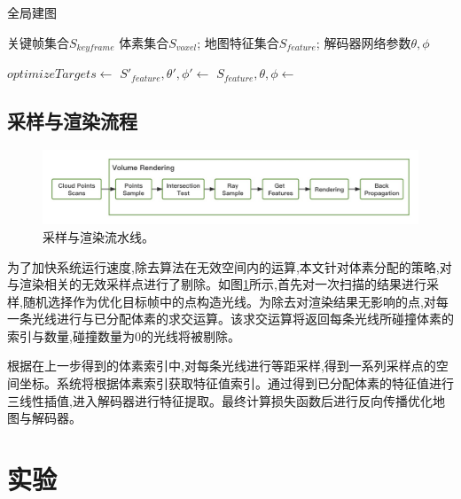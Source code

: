 \begin{algorithm}
    \caption{全局建图}\label{globalmapping}
    \begin{algorithmic}[1]
      \Require
        关键帧集合$S_{keyframe}$
      \Ensure
        体素集合$S_{voxel}$;
        地图特征集合$S_{feature}$;
        解码器网络参数$\theta, \phi$
        
      \State$optimizeTargets\gets$
      \State $S'_{feature}, \theta', \phi'\gets$
      \State $S_{feature},\theta,\phi\gets$
      \State {}
      \EndFunction
    \end{algorithmic}
\end{algorithm}

\subsection{采样与渲染流程}
\begin{figure}[htbp]
    \includegraphics[scale = 0.31]{figures/renderpipeline.jpg}
    \centering
    \caption{采样与渲染流水线。}\label{renderpipeline}
\end{figure}
为了加快系统运行速度,除去算法在无效空间内的运算,本文针对体素分配的策略,对与渲染相关的无效采样点进行了剔除。如图\ref{renderpipeline}所示,首先对一次扫描的结果进行采样,随机选择作为优化目标帧中的点构造光线。为除去对渲染结果无影响的点,对每一条光线进行与已分配体素的求交运算。该求交运算将返回每条光线所碰撞体素的索引与数量,碰撞数量为0的光线将被剔除。

根据在上一步得到的体素索引中,对每条光线进行等距采样,得到一系列采样点的空间坐标。系统将根据体素索引获取特征值索引。通过得到已分配体素的特征值进行三线性插值,进入解码器进行特征提取。最终计算损失函数后进行反向传播优化地图与解码器。
\clearpage
\section{实验}\label{numerical experiments}
